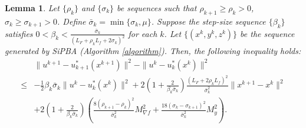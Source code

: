 \documentclass{article}
\newtheorem{lemma}[theorem]{Lemma}
\begin{document}
	 \begin{lemma}\label{udescentlemma}
Let $\{\rho_k\}$ and $\{\sigma_k\}$ be sequences such that  $\rho_{k+1} \ge \rho_{k}>0$, $\sigma_{k} \ge\sigma_{k+1}>0$. Define $\bar{\sigma}_k = \min\{\sigma_k, \mu\}$. Suppose the step-size sequence $\{\beta_k\}$ satisfies $0<\beta_k<\frac{\bar{\sigma}_k}{(L_F + \rho_k L_f + 2\sigma_k)^2}$ for each $k$. Let $\{(x^k, y^k, z^k)\}$ be the sequence generated by SiPBA (Algorithm \ref{algorithm}).
Then, the following inequality holds:
\begin{equation}\label{udescentlemmaeq}
\begin{aligned}
        & \|u^{k+1}- u_{k+1}^*(x^{k+1})\|^2-\|u^{k}-u_{k}^*(x^{k})\|^2 \\\le&-\frac{1}{2}\beta_k\bar{\sigma}_k \|u^{k}-u_{k}^*(x^{k})\|^2 + 2(1+\frac{2}{\beta_k\bar{\sigma}_k})\frac{(L_{F}+2\rho_kL_{f})^2}{\bar{\sigma}_k^2}\|x^{k+1}-x^k\|^2 \\
        &+2(1+\frac{2}{\beta_k\bar{\sigma}_k}) \left( \frac{8(\rho_{k+1} - \rho_k)^2}{\bar{\sigma}_k^2}M_{\nabla f}^2 + \frac{18(\sigma_{k} - \sigma_{k+1})^2}{\bar{\sigma}_k^2}M_y^2 \right).
        \end{aligned}
    \end{equation}
    \end{lemma}
\end{document}
